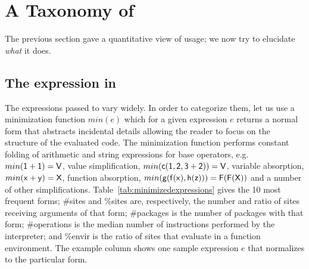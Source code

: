 \documentclass[screen,acmsmall]{acmart}
\begin{document}
\section{A Taxonomy of \Eval}

The previous section gave a quantitative view of \eval usage; we now try to
elucidate \emph{what} it does.

\subsection{The expression in \eval} \label{sec:minimized}


The expressions passed to \eval vary widely. In order to categorize them, let us
use a minimization function $min(e)$ which for a given expression $e$ returns a
normal form that abstracts incidental details allowing the reader to focus on
the structure of the evaluated code. The minimization function performs constant
folding of arithmetic and string expressions for base operators, e.g.
$min({\sf 1+1})={\sf V}$, value simplification, $min({\sf c(1,2,3+2)})={\sf V}$,
variable absorption, $min({\sf x+y})={\sf X}$, function absorption,
$min({\sf g(f(x),h(z))})={\sf F(F(X))}$ and a number of other simplifications.
Table~\ref{tab:minimizedexpressions} gives the 10 most frequent forms; \#sites
and \%sites are, respectively, the number and ratio of sites receiving arguments
of that form; \#packages is the number of packages with that form; \#operations
is the median number of instructions performed by the interpreter; and \%envir
is the ratio of sites that evaluate in a function environment. The example
column shows one sample expression $e$ that normalizes to the particular form.
\end{document}
